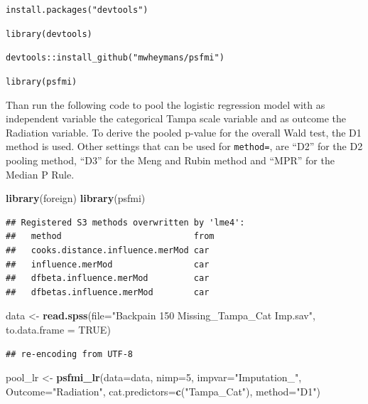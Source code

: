 \documentclass[
]{book}
\newenvironment{Shaded}{\begin{snugshade}}{\end{snugshade}}
\newcommand{\DataTypeTok}[1]{\textcolor[rgb]{0.13,0.29,0.53}{#1}}
\newcommand{\DecValTok}[1]{\textcolor[rgb]{0.00,0.00,0.81}{#1}}
\newcommand{\KeywordTok}[1]{\textcolor[rgb]{0.13,0.29,0.53}{\textbf{#1}}}
\newcommand{\NormalTok}[1]{#1}
\newcommand{\OtherTok}[1]{\textcolor[rgb]{0.56,0.35,0.01}{#1}}
\newcommand{\StringTok}[1]{\textcolor[rgb]{0.31,0.60,0.02}{#1}}
\begin{document}
\texttt{install.packages("devtools")}

\texttt{library(devtools)}

\texttt{devtools::install\_github("mwheymans/psfmi")}

\texttt{library(psfmi)}

Than run the following code to pool the logistic regression model with
as independent variable the categorical Tampa scale variable and as
outcome the Radiation variable. To derive the pooled p-value for the
overall Wald test, the D1 method is used. Other settings that can be
used for \texttt{method=}, are ``D2'' for the D2 pooling method, ``D3''
for the Meng and Rubin method and ``MPR'' for the Median P Rule.

\begin{Shaded}
\begin{Highlighting}[]
\KeywordTok{library}\NormalTok{(foreign)}
\KeywordTok{library}\NormalTok{(psfmi)}
\end{Highlighting}
\end{Shaded}

\begin{verbatim}
## Registered S3 methods overwritten by 'lme4':
##   method                          from
##   cooks.distance.influence.merMod car 
##   influence.merMod                car 
##   dfbeta.influence.merMod         car 
##   dfbetas.influence.merMod        car
\end{verbatim}

\begin{Shaded}
\begin{Highlighting}[]
\NormalTok{data <-}\StringTok{ }\KeywordTok{read.spss}\NormalTok{(}\DataTypeTok{file=}\StringTok{"Backpain 150 Missing_Tampa_Cat Imp.sav"}\NormalTok{, }\DataTypeTok{to.data.frame =} \OtherTok{TRUE}\NormalTok{) }
\end{Highlighting}
\end{Shaded}

\begin{verbatim}
## re-encoding from UTF-8
\end{verbatim}

\begin{Shaded}
\begin{Highlighting}[]
\NormalTok{pool_lr <-}\StringTok{ }\KeywordTok{psfmi_lr}\NormalTok{(}\DataTypeTok{data=}\NormalTok{data, }\DataTypeTok{nimp=}\DecValTok{5}\NormalTok{, }\DataTypeTok{impvar=}\StringTok{"Imputation_"}\NormalTok{, }\DataTypeTok{Outcome=}\StringTok{"Radiation"}\NormalTok{,}
  \DataTypeTok{cat.predictors=}\KeywordTok{c}\NormalTok{(}\StringTok{"Tampa_Cat"}\NormalTok{), }\DataTypeTok{method=}\StringTok{"D1"}\NormalTok{)}
\end{Highlighting}
\end{Shaded}
\end{document}
